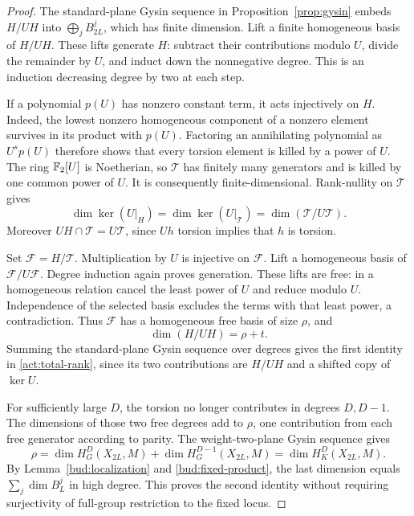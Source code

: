 \begin{proof}
The standard-plane Gysin sequence in Proposition~\ref{prop:gysin}
embeds $H/UH$ into $\bigoplus_j B_{2L}^j$, which has finite dimension.
Lift a finite homogeneous basis of $H/UH$. These lifts generate $H$:
subtract their contributions modulo $U$, divide the remainder by $U$,
and induct down the nonnegative degree. This is an induction decreasing
degree by two at each step.

If a polynomial $p(U)$ has nonzero constant term, it acts injectively
on $H$. Indeed, the lowest nonzero homogeneous component of a nonzero
element survives in its product with $p(U)$. Factoring an annihilating
polynomial as $U^s p(U)$ therefore shows that every torsion element is
killed by a power of $U$. The ring $\mathbb F_2[U]$ is Noetherian, so $\mathcal T$
has finitely many generators and is killed by one common power of $U$.
It is consequently finite-dimensional. Rank-nullity on $\mathcal T$
gives
\[
 \dim\ker(U|_H)=\dim\ker(U|_{\mathcal T})
 =\dim(\mathcal T/U\mathcal T).
\]
Moreover $UH\cap\mathcal T=U\mathcal T$, since $Uh$ torsion implies
that $h$ is torsion.

Set $\mathcal F=H/\mathcal T$. Multiplication by $U$ is injective on
$\mathcal F$. Lift a homogeneous basis of $\mathcal F/U\mathcal F$.
Degree induction again proves generation. These lifts are free: in a
homogeneous relation cancel the least power of $U$ and reduce modulo
$U$. Independence of the selected basis excludes the terms with that
least power, a contradiction. Thus $\mathcal F$ has a homogeneous free
basis of size $\rho$, and
\[
 \dim(H/UH)=\rho+t.
\]
Summing the standard-plane Gysin sequence over degrees gives the first
identity in \eqref{act:total-rank}, since its two contributions are
$H/UH$ and a shifted copy of $\ker U$.

For sufficiently large $D$, the torsion no longer contributes in
degrees $D,D-1$. The dimensions of those two free degrees add to
$\rho$, one contribution from each free generator according to parity.
The weight-two-plane Gysin sequence gives
\[
 \rho=\dim H_G^D(X_{2L},M)+\dim H_G^{D-1}(X_{2L},M)
 =\dim H_K^D(X_{2L},M).
\]
By Lemma~\ref{bud:localization} and \eqref{bud:fixed-product}, the last
dimension equals $\sum_j\dim B_L^j$ in high degree. This proves the
second identity without requiring surjectivity of full-group restriction
to the fixed locus.
\end{proof}

